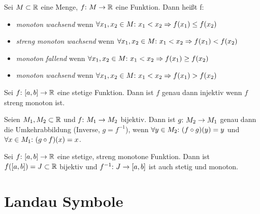 \begin{frameddefn}
	Sei $M \subset \mathbb{R}$ eine Menge, $f{:}\  M \to \mathbb{R}$ eine Funktion. Dann heißt f:
	\begin{itemize}
		\item \textit{monoton wachsend} wenn $\forall x_1, x_2 \in M{:}\  x_1 < x_2 \Rightarrow f(x_1) \leq f(x_2)$
		\item \textit{streng monoton wachsend} wenn $\forall x_1, x_2 \in M{:}\  x_1 < x_2 \Rightarrow f(x_1) < f(x_2)$
		\item \textit{monoton fallend} wenn $\forall x_1, x_2 \in M{:}\  x_1 < x_2 \Rightarrow f(x_1) \geq f(x_2)$
		\item \textit{monoton wachsend} wenn $\forall x_1, x_2 \in M{:}\  x_1 < x_2 \Rightarrow f(x_1) > f(x_2)$
	\end{itemize}
\end{frameddefn}

\begin{framedthm}
	Sei $f{:}\  [a,b] \to \mathbb{R}$ eine stetige Funktion. Dann ist $f$ genau dann injektiv wenn $f$ streng monoton ist.
\end{framedthm}

\begin{frameddefn}[Umkehrabbildung]
	Seien $M_1, M_2 \subset \mathbb{R}$ und $f{:}\  M_1 \to M_2$ bijektiv. Dann ist $g{:}\  M_2 \to M_1$ genau dann die Umkehrabbildung (Inverse, $g=f^{-1}$), wenn $\forall y \in M_2{:}\  (f \circ g)(y) = y$ und\\ $\forall x \in M_1{:}\  (g \circ f)(x) = x$.
\end{frameddefn}

\begin{framedthm}
	Sei $f{:}\  [a,b] \to \mathbb{R}$ eine stetige, streng monotone Funktion. Dann ist $f([a,b]) = J \subset \mathbb{R}$ bijektiv und $f^{-1}{:}\  J \to [a,b]$ ist auch stetig und monoton.
\end{framedthm}

\section{Landau Symbole}

